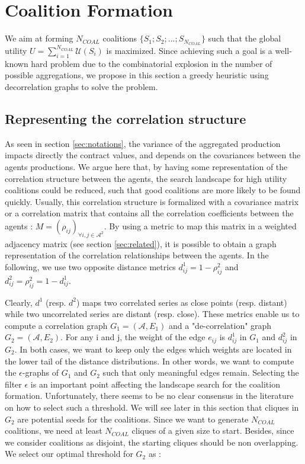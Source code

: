 \documentclass[journal]{IEEEtran}
\begin{document}
%
%
\section{Coalition Formation}
\label{sec:forming}
We aim at forming $ N_{COAL} $ coalitions $ \{ S_1;S_2;...;S_{N_{COAL}} \} $ such that the global utility $ U = \sum_{i = 1}^{N_{COAL}} \mathcal{U}(S_i) $ is maximized. Since achieving such a goal is a well-known hard problem due to the combinatorial explosion in the number of possible aggregations, we propose in this section a greedy heuristic using decorrelation graphs to solve the problem.

\subsection{Representing the correlation structure}
As seen in section \ref{sec:notations}, the variance of the aggregated production impacts directly the contract values, and depends on the covariances between the agents productions. We argue here that, by having some representation of the correlation structure between the agents, the search landscape for high utility coalitions could be reduced, such that good coalitions are more likely to be found quickly. Usually, this correlation structure is formalized with a covariance matrix or a correlation matrix that contains all the correlation coefficients between the agents : $ M = (\rho_{ij})_{\forall i,j \in \mathcal{A}^{2}}$. By using a metric to map this matrix in a weighted adjacency matrix (see section \ref{sec:related}), it is possible to obtain a graph representation of the correlation relationships between the agents. In the following, we use two opposite distance metrics $  d_{ij}^{1} = 1 - \rho_{ij}^{2} $ and $ d_{ij}^{2} = \rho_{ij}^{2} = 1 - d_{ij}^{1} $.


Clearly, $ d^{1} $ (resp. $ d^{2} $) maps two correlated series as close points (resp. distant) while two uncorrelated series are distant (resp. close). These metrics enable us to compute a correlation graph $ G_{1} = (\mathcal{A}, E_{1}) $ and a "de-correlation" graph $ G_{2} = (\mathcal{A}, E_{2} ) $. For any i and j, the weight of the edge $ e_{ij} $ is $ d_{ij}^{1} $ in $ G_{1} $ and $ d_{ij}^{2} $ in $ G_{2} $. In both cases, we want to keep only the edges which weights are located in the lower tail of the distance distributions. In other words, we want to compute the $ \epsilon$-graphs of $ G_{1} $ and $ G_{2} $ such that only meaningful edges remain. Selecting the filter $ \epsilon $ is an important point affecting the landscape search for the coalition formation. Unfortunately, there seems to be no clear consensus in the literature on how to select such a threshold. We will see later in this section that cliques in $ G_{2} $ are potential seeds for the coalitions. Since we want to generate $ N_{COAL} $ coalitions, we need at least $ N_{COAL} $ cliques of a given size to start. Besides, since we consider coalitions as disjoint, the starting cliques should be non overlapping. We select our optimal threshold for $ G_{2} $ as :
\end{document}
